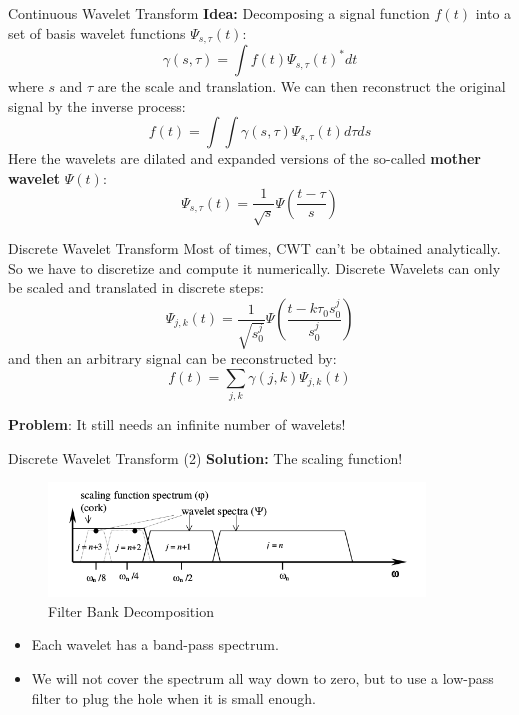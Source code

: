 \documentclass{beamer}
\begin{document}
\begin{frame}{Continuous Wavelet Transform}
\textbf{Idea:} Decomposing a signal function $f(t)$ into a set of basis wavelet functions $\Psi_{s,\tau}(t)$:
$$ \gamma(s, \tau) = \int f(t) \Psi_{s, \tau}(t)^{*} dt $$
where $s$ and $\tau$ are the scale and translation. We can then reconstruct the original signal by the inverse process:
$$ f(t) = \int \int \gamma(s,\tau) \Psi_{s,\tau}(t) d\tau d s$$
Here the wavelets are dilated and expanded versions of the so-called \textbf{mother wavelet} $\Psi(t)$:
$$ \Psi_{s, \tau}(t) = \frac{1}{\sqrt{s}} \Psi \left(\frac{t-\tau}{s} \right)$$
\end{frame}


\begin{frame}{Discrete Wavelet Transform}
Most of times, CWT can't be obtained analytically. So we have to discretize and compute it numerically. Discrete Wavelets can only be scaled and translated in discrete steps:
$$\Psi_{j,k}(t) = \frac{1}{\sqrt{s_0^j}} \Psi \left(\frac{t - k \tau_0 s_0^j}{s_0^j} \right)$$
and then an arbitrary signal can be reconstructed by:
$$ f(t) = \sum_{j,k} \gamma(j,k) \Psi_{j,k}(t) $$

\textbf{Problem}: It still needs an infinite number of wavelets!
\end{frame}


\begin{frame}{Discrete Wavelet Transform (2)}
\textbf{Solution:} The scaling function!

\begin{figure}[htpb!]
\centering
\includegraphics[width=10cm]{scaling_function}
\caption{Filter Bank Decomposition}
\end{figure}

\begin{itemize}
    \item Each wavelet has a band-pass spectrum.
    \item We will not cover the spectrum all way down to zero, but to use a low-pass filter to plug the hole
    when it is small enough.
\end{itemize}
        
\end{frame}
\end{document}
